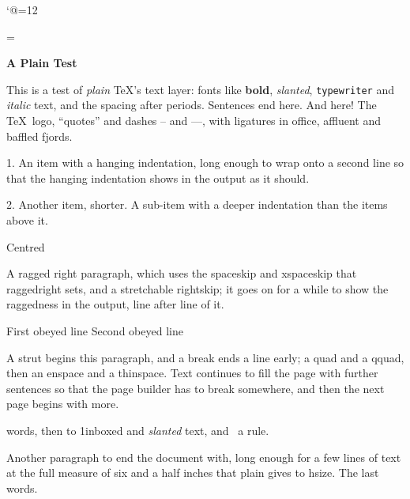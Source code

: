 \def\showhyphens#1{\setbox0\vbox{\parfillskip\z@skip\hsize\maxdimen\tenrm
  \pretolerance\m@ne\tolerance\m@ne\hbadness0\showboxdepth0\ #1}}

\normalbaselines\rm %
\nonfrenchspacing %
\catcode`@=12 %

\def\fmtname{plain}\def\fmtversion{3.1415926535} %

\output={}
\vsize=4in
\centerline{\bf A Plain Test}
\bigskip
\noindent This is a test of {\it plain\/} \TeX's text layer: fonts like {\bf bold},
{\sl slanted}, {\tt typewriter} and {\it italic\/} text, and the spacing after
periods. Sentences end here.  And here!  The \TeX\ logo, ``quotes'' and dashes
-- and ---, with ligatures in office, affluent and baffled fjords.

\smallskip
\item{1.} An item with a hanging indentation, long enough to wrap onto a second
line so that the hanging indentation shows in the output as it should.
\item{2.} Another item, shorter.
 A sub-item with a deeper indentation than the items above it.

\medskip
{}
\centerline{Centred}
\smallbreak
{\raggedright A ragged right paragraph, which uses the spaceskip and xspaceskip
that raggedright sets, and a stretchable rightskip; it goes on for a while to
show the raggedness in the output, line after line of it.\par}
\medbreak
{\obeylines
First obeyed line
Second obeyed line
\par}
\bigbreak
\noindent\strut A strut begins this paragraph, \hfil\break and a break ends a line
early; \quad a quad and \qquad a qquad, then \enspace an enspace and \thinspace a
thinspace. Text continues to fill the page with further sentences so that the
page builder has to break somewhere, and then the next page begins with more.

\noindent{} words, then \hbox to 1in{\hss boxed\hss} and
{\sl slanted} text, and \vrule\ a rule.

Another paragraph to end the document with, long enough for a few lines of
text at the full measure of six and a half inches that plain gives to hsize.
\filbreak
The last words.
\bye
